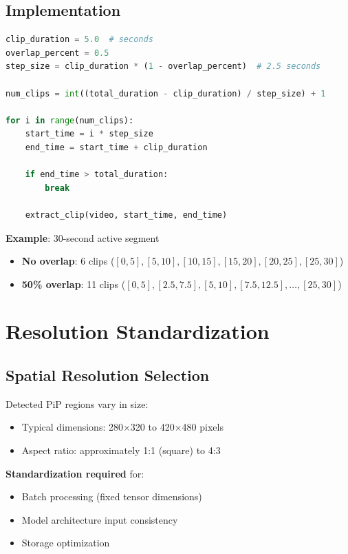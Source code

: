\documentclass[11pt,a4paper]{article}
\begin{document}
\subsection{Implementation}

\begin{lstlisting}[language=Python]
clip_duration = 5.0  # seconds
overlap_percent = 0.5
step_size = clip_duration * (1 - overlap_percent)  # 2.5 seconds

num_clips = int((total_duration - clip_duration) / step_size) + 1

for i in range(num_clips):
    start_time = i * step_size
    end_time = start_time + clip_duration
    
    if end_time > total_duration:
        break
    
    extract_clip(video, start_time, end_time)
\end{lstlisting}

\textbf{Example}: 30-second active segment
\begin{itemize}
    \item \textbf{No overlap}: 6 clips ($[0,5], [5,10], [10,15], [15,20], [20,25], [25,30]$)
    \item \textbf{50\% overlap}: 11 clips ($[0,5], [2.5,7.5], [5,10], [7.5,12.5], \ldots, [25,30]$)
\end{itemize}

\section{Resolution Standardization}

\subsection{Spatial Resolution Selection}

Detected PiP regions vary in size:
\begin{itemize}
    \item Typical dimensions: 280$\times$320 to 420$\times$480 pixels
    \item Aspect ratio: approximately 1:1 (square) to 4:3
\end{itemize}

\textbf{Standardization required} for:
\begin{itemize}
    \item Batch processing (fixed tensor dimensions)
    \item Model architecture input consistency
    \item Storage optimization
\end{itemize}
\end{document}
